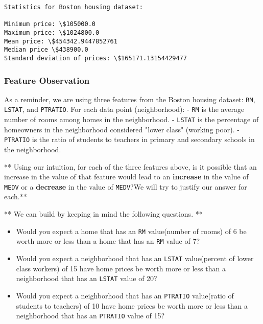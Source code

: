 \documentclass[11pt]{article}
\providecommand{\tightlist}{%
      \setlength{\itemsep}{0pt}\setlength{\parskip}{0pt}}
\begin{document}
    \begin{Verbatim}[commandchars=\\\{\}]
Statistics for Boston housing dataset:

Minimum price: \$105000.0
Maximum price: \$1024800.0
Mean price: \$454342.9447852761
Median price \$438900.0
Standard deviation of prices: \$165171.13154429477

    \end{Verbatim}

    \subsubsection{Feature Observation}\label{feature-observation}

As a reminder, we are using three features from the Boston housing
dataset: \texttt{\textquotesingle{}RM\textquotesingle{}},
\texttt{\textquotesingle{}LSTAT\textquotesingle{}}, and
\texttt{\textquotesingle{}PTRATIO\textquotesingle{}}. For each data
point (neighborhood): - \texttt{\textquotesingle{}RM\textquotesingle{}}
is the average number of rooms among homes in the neighborhood. -
\texttt{\textquotesingle{}LSTAT\textquotesingle{}} is the percentage of
homeowners in the neighborhood considered "lower class" (working poor).
- \texttt{\textquotesingle{}PTRATIO\textquotesingle{}} is the ratio of
students to teachers in primary and secondary schools in the
neighborhood.

** Using our intuition, for each of the three features above, is it
possible that an increase in the value of that feature would lead to an
\textbf{increase} in the value of
\texttt{\textquotesingle{}MEDV\textquotesingle{}} or a \textbf{decrease}
in the value of \texttt{\textquotesingle{}MEDV\textquotesingle{}}?We
will try to justify our answer for each.**

** We can build by keeping in mind the following questions. **

\begin{itemize}
\tightlist
\item
  Would you expect a home that has an
  \texttt{\textquotesingle{}RM\textquotesingle{}} value(number of rooms)
  of 6 be worth more or less than a home that has an
  \texttt{\textquotesingle{}RM\textquotesingle{}} value of 7?
\item
  Would you expect a neighborhood that has an
  \texttt{\textquotesingle{}LSTAT\textquotesingle{}} value(percent of
  lower class workers) of 15 have home prices be worth more or less than
  a neighborhood that has an
  \texttt{\textquotesingle{}LSTAT\textquotesingle{}} value of 20?
\item
  Would you expect a neighborhood that has an
  \texttt{\textquotesingle{}PTRATIO\textquotesingle{}} value(ratio of
  students to teachers) of 10 have home prices be worth more or less
  than a neighborhood that has an
  \texttt{\textquotesingle{}PTRATIO\textquotesingle{}} value of 15?
\end{itemize}
\end{document}
